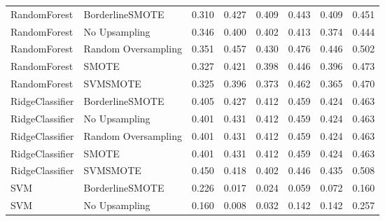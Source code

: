 \begin{tabular}{llllllll}
                RandomForest &     BorderlineSMOTE & 0.310 &                     0.427 &                 0.409 &                  0.443 &                                   0.409 &     0.451 \\
                RandomForest &       No Upsampling & 0.346 &                     0.400 &                 0.402 &                  0.413 &                                   0.374 &     0.444 \\
                RandomForest & Random Oversampling & 0.351 &                     0.457 &                 0.430 &                  0.476 &                                   0.446 &     0.502 \\
                RandomForest &               SMOTE & 0.327 &                     0.421 &                 0.398 &                  0.446 &                                   0.396 &     0.473 \\
                RandomForest &            SVMSMOTE & 0.325 &                     0.396 &                 0.373 &                  0.462 &                                   0.365 &     0.470 \\
             RidgeClassifier &     BorderlineSMOTE & 0.405 &                     0.427 &                 0.412 &                  0.459 &                                   0.424 &     0.463 \\
             RidgeClassifier &       No Upsampling & 0.401 &                     0.431 &                 0.412 &                  0.459 &                                   0.424 &     0.463 \\
             RidgeClassifier & Random Oversampling & 0.401 &                     0.431 &                 0.412 &                  0.459 &                                   0.424 &     0.463 \\
             RidgeClassifier &               SMOTE & 0.401 &                     0.431 &                 0.412 &                  0.459 &                                   0.424 &     0.463 \\
             RidgeClassifier &            SVMSMOTE & 0.450 &                     0.418 &                 0.402 &                  0.446 &                                   0.435 &     0.508 \\
                         SVM &     BorderlineSMOTE & 0.226 &                     0.017 &                 0.024 &                  0.059 &                                   0.072 &     0.160 \\
                         SVM &       No Upsampling & 0.160 &                     0.008 &                 0.032 &                  0.142 &                                   0.142 &     0.257 \\

\end{tabular}
